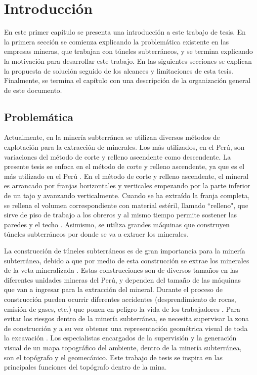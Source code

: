 \chapter{Introducción}

En este primer capítulo se presenta una introducción a este trabajo de 
tesis. En la primera sección se comienza explicando la problemática existente 
en las empresas mineras, que trabajan con túneles subterráneos, y se termina 
explicando la motivación para desarrollar este trabajo. En las siguientes secciones se explican 
la propuesta de solución seguido de los alcances y limitaciones de esta tesis. Finalmente, se termina 
el capítulo con una descripción de la organización general de este documento.

\section{Problemática}

Actualmente, en la minería subterránea se utilizan diversos métodos de explotación para la 
extracción de minerales. Los más utilizados, en el Perú, son variaciones del método de 
corte y relleno ascendente como descendente. La presente tesis se enfoca en el método 
de corte y relleno ascendente, ya que es el más utilizado en el Perú \cite{Cruz2012}. En 
el método de corte y relleno ascendente, el mineral es arrancado por franjas horizontales 
y verticales empezando por la parte inferior de un tajo y avanzando verticalmente. Cuando 
se ha extraído la franja completa, se rellena el volumen correspondiente con material 
estéril, llamado ``relleno", que sirve de piso de trabajo a los obreros y al mismo tiempo permite 
sostener las paredes y el techo \cite{MunozDelPino2012}. Asimismo, se utiliza grandes 
máquinas que construyen túneles subterráneos por donde se va a extraer los minerales. 

La construcción de túneles subterráneos es de gran importancia para la minería subterránea, 
debido a que por medio de esta construcción se extrae los minerales de la veta mineralizada 
\cite{EtapaTunelSubterraneo}. Estas construcciones son de diversos tamaños en las diferentes 
unidades mineras del Perú, y dependen del tamaño de las máquinas que van a ingresar para la 
extracción del mineral. Durante el proceso de construcción pueden ocurrir diferentes accidentes 
(desprendimiento de rocas, emisión de gases, etc.) que ponen en peligro la vida de los 
trabajadores \cite{GasesMinero}. Para evitar los riesgos dentro de la minería subterránea, se 
necesita supervisar la zona de construcción y a su vez obtener una representación geométrica 
visual de toda la excavación \cite{SeguridadMinera}. Los especialistas encargados de la supervisión 
y la generación visual de un mapa topográfico del ambiente, dentro de la minería subterránea, son 
el topógrafo y el geomecánico. Este trabajo de tesis se inspira en las principales funciones del 
topógrafo dentro de la mina. 


